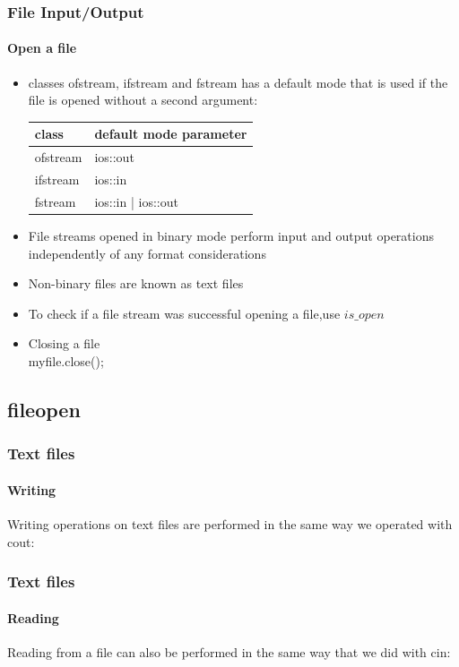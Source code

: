 \documentclass[hyperref={pdfpagelabels=true}]{beamer}
\begin{document}
\begin{frame}
\frametitle{File Input/Output}
\framesubtitle{Open a file}
\scriptsize
\begin{itemize}[<+->]
\item classes ofstream, ifstream and fstream has a default mode that is used if the file is opened without a second argument: \\
\scriptsize{
\begin{tabular}{| l | l |}
\hline 
{\bf class}	 &{\bf default mode parameter} \\ \hline
ofstream	&ios::out \\ \hline
ifstream	&ios::in \\ \hline
fstream	&ios::in | ios::out \\ \hline
\end{tabular}}
\item File streams opened in binary mode perform input and output operations independently of any format considerations
\item Non-binary files are known as text files \\
 
\item To check if a file stream was successful opening a file,use $is\_open$ \\

\item Closing a file \\ 	 myfile.close();
\end{itemize}
\end{frame}

\subsection{fileopen}

\begin{frame}
\frametitle{Text files}
\framesubtitle{Writing}
Writing operations on text files are performed in the same way we operated with cout:
\begin{tcolorbox}[title= ,width=14.85 cm]
\scriptsize

\end{tcolorbox}
\end{frame}

\begin{frame}[shrink]
\frametitle{Text files}
\framesubtitle{Reading}
Reading from a file can also be performed in the same way that we did with cin:
\begin{tcolorbox}[title= ,width=14.85 cm]
\scriptsize

\end{tcolorbox}
\end{frame}
\end{document}
